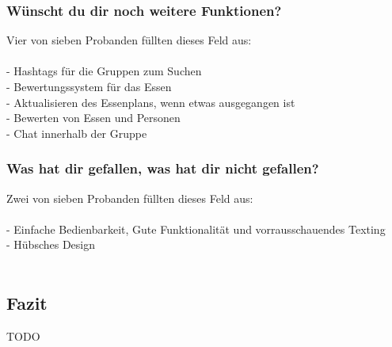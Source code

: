 \documentclass[a4paper]{scrreprt}
\begin{document}
\subsubsection*{Wünscht du dir noch weitere Funktionen?}
Vier von sieben Probanden füllten dieses Feld aus: \\
\ \\
- Hashtags für die Gruppen zum Suchen \\
- Bewertungssystem für das Essen \\
- Aktualisieren des Essenplans, wenn etwas ausgegangen ist \\ 
- Bewerten von Essen und Personen \\
- Chat innerhalb der Gruppe

\subsubsection*{Was hat dir gefallen, was hat dir nicht gefallen?}
Zwei von sieben Probanden füllten dieses Feld aus: \\
\ \\
- Einfache Bedienbarkeit, Gute Funktionalität und vorrausschauendes Texting \\
- Hübsches Design \\
\ \\
\subsection*{Fazit}

TODO


\printglossaries
\end{document}
